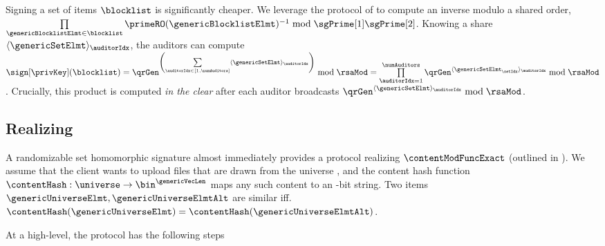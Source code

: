 %
Signing a set of items $\blocklist$ is significantly cheaper.  We leverage the protocol of \citet[Fig. 3]{catalano2000computing} to compute an inverse modulo a shared order, $\prod\limits_{\genericBlocklistElmt \in \blocklist}\primeRO(\genericBlocklistElmt)^{-1} \bmod \sgPrime[1] \sgPrime[2]$. Knowing a share $\langle \genericSetElmt \rangle_{\auditorIdx}$, the auditors can compute $\sign[\privKey](\blocklist) = \qrGen^{\left(\sum\limits_{\auditorIdx \in [1, \numAuditors]}\langle \genericSetElmt \rangle_{\auditorIdx}\right)}\bmod \rsaMod = \prod\limits_{\auditorIdx = 1}^{\numAuditors} \qrGen^{\langle \genericSetElmt_{\setIdx} \rangle_{\auditorIdx}} \bmod \rsaMod$. Crucially, this product is computed \emph{in the clear} after each auditor broadcasts  $\qrGen^{\langle \genericSetElmt \rangle_{\auditorIdx}} \bmod \rsaMod$. 

\subsection{Realizing \contentModFuncExact}
%
A randomizable set homomorphic signature \ourSigScheme almost immediately provides a protocol realizing $\contentModFuncExact$ (outlined in ). We assume that the client wants to upload files that are drawn from the universe \universe, and the content hash function $\contentHash: \universe \rightarrow \bin^{\genericVecLen}$ maps any such content to an \genericVecLen-bit string. Two items $\genericUniverseElmt, \genericUniverseElmtAlt$ are similar iff. $\contentHash(\genericUniverseElmt) = \contentHash(\genericUniverseElmtAlt)$.  



At a high-level, the protocol has the following steps

